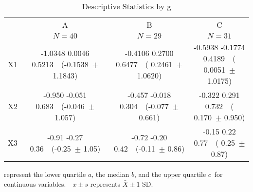 \begin{table}[!tbp]
\caption{Descriptive Statistics by g\label{s}} 
\begin{center}
\begin{tabular}{lccc}
\hline\hline
\multicolumn{1}{l}{}&\multicolumn{1}{c}{A}&\multicolumn{1}{c}{B}&\multicolumn{1}{c}{C}\tabularnewline
&\multicolumn{1}{c}{{\scriptsize $N=40$}}&\multicolumn{1}{c}{{\scriptsize $N=29$}}&\multicolumn{1}{c}{{\scriptsize $N=31$}}\tabularnewline
\hline
X1&{\scriptsize -1.0348}  0.0046 {\scriptsize  0.5213}~~(-0.1538~$\pm$ 1.1843)&{\scriptsize -0.4106}  0.2700 {\scriptsize  0.6477}~~( 0.2461~$\pm$ 1.0620)&{\scriptsize -0.5938} -0.1774 {\scriptsize  0.4189}~~( 0.0051~$\pm$ 1.0175)\tabularnewline
X2&{\scriptsize -0.950} -0.051 {\scriptsize  0.683}~~(-0.046~$\pm$ 1.057)&{\scriptsize -0.457} -0.018 {\scriptsize  0.304}~~(-0.077~$\pm$ 0.661)&{\scriptsize -0.322}  0.291 {\scriptsize  0.732}~~( 0.170~$\pm$ 0.950)\tabularnewline
X3&{\scriptsize -0.91} -0.27 {\scriptsize  0.36}~~(-0.25~$\pm$ 1.05)&{\scriptsize -0.72} -0.20 {\scriptsize  0.42}~~(-0.11~$\pm$ 0.86)&{\scriptsize -0.15}  0.22 {\scriptsize  0.77}~~( 0.25~$\pm$ 0.87)\tabularnewline
\hline
\end{tabular}\end{center}
 represent the lower quartile $a$, the median $b$, and the upper quartile $c$\ for continuous variables.~~$x\pm s$ represents $\bar{X}\pm 1$ SD.\end{table}
